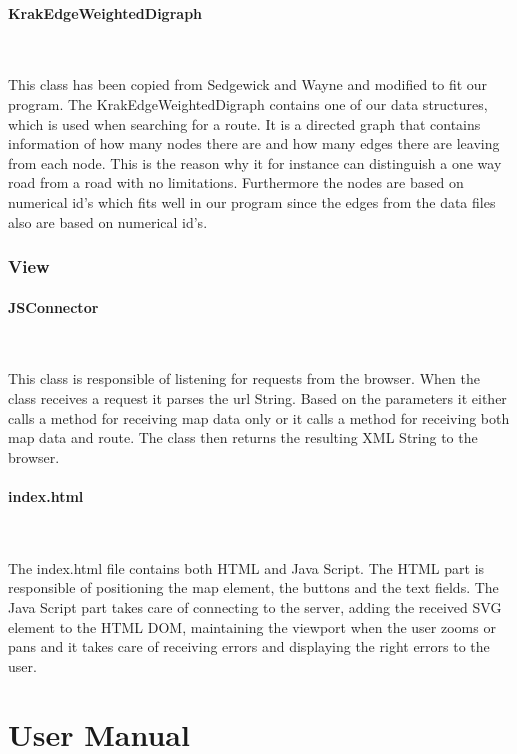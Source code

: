 \documentclass[a4paper,10pt,titlepage]{article}
\begin{document}
				
				\paragraph{KrakEdgeWeightedDigraph \cite{sedgewickAndWayneEdgeWeightedDigraph}}\mbox{}\
				

This class has been copied from Sedgewick and Wayne and modified to fit our program. The KrakEdgeWeightedDigraph contains one of our data structures, which is used when searching for a route. It is a directed graph that contains information of how many nodes there are and how many edges there are leaving from each node. This is the reason why it for instance can distinguish a one way road from a road with no limitations. Furthermore the nodes are based on numerical id’s which fits well in our program since the edges from the data files also are based on numerical id’s. \\

				
			\subsubsection{View}
			
				\paragraph{JSConnector}\mbox{}\
				
				This class is responsible of listening for requests from the browser. When the class receives a request it parses the url String. Based on the parameters it either calls a method for receiving map data only or it calls a method for receiving both map data and route. The class then returns the resulting XML String to the browser. 


						
				\paragraph{index.html}\mbox{}\
				
				The index.html file contains both HTML and Java Script. The HTML part is responsible of positioning the map element, the buttons and the text fields. The Java Script part takes care of connecting to the server, adding the received SVG element to the HTML DOM, maintaining the viewport when the user zooms or pans and it takes care of receiving errors and displaying the right errors to the user. 

	\newpage
	\section{User Manual}
\end{document}
